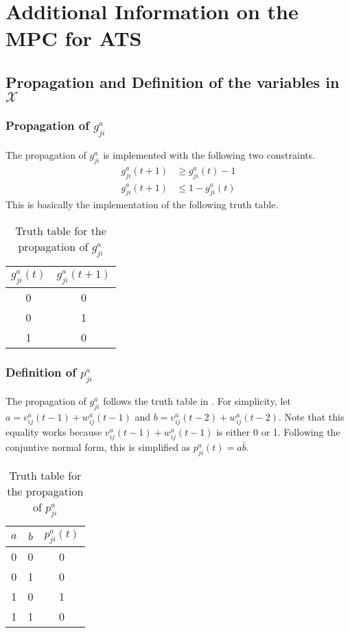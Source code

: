 \chapter{Additional Information on the MPC for ATS}\label{appendix:additional_info_mpc_ats}

\section{Propagation and Definition of the variables in $\mathcal{X}$}

\subsection{Propagation of $g^a_{ji}$}\label{appendix:sec:propagation_g}
The propagation of $g^a_{ji}$ is implemented with the following two constraints. 
\begin{align*}
	g^a_{ji}(t+1) &\ge g^a_{ji}(t) - 1\\
	g^a_{ji}(t+1) &\leq 1- g^a_{ji}(t) 
\end{align*}
This is basically the implementation of the following truth table.
\begin{table}[h]
	\centering
	\begin{tabular}{ |c|c|}
		\hline
		$g^a_{ji}(t)$ &$g^a_{ji}(t+1)$ \\
		\hline
		0&0\\
		0&1\\
		1&0\\
	\end{tabular}
	\label{appendix:tab:propagation_of_arrived}
	\caption{Truth table for the propagation of $g^a_{ji}$}
\end{table}


\subsection{Definition of $p^a_{ji}$}\label{appendix:sec:definition_p}
The propagation of $g^a_{ji}$ follows the truth table in . For simplicity, let $a = v_{ij}^a(t-1) + w_{ij}^a(t-1) $ and $b = v_{ij}^a(t-2) +w_{ij}^a(t-2)$. Note that this equality works because $v_{ij}^a(t-1) + w_{ij}^a(t-1)$ is either 0 or 1. Following the conjuntive normal form, this is simplified as $p^a_{ji}(t) = a\bar{b}$.


\begin{table}
	\centering
	\begin{tabular}{ |c|c|c|}
		\hline
		$a$ &$b$&$p^a_{ji}(t)$ \\
		\hline
		0&0&0\\
		0&1&0\\
		1&0&1\\
		1&1&0\\
	\end{tabular}
	\label{appendix:tab:propagation_of_departed}
	\caption{Truth table for the propagation of $p^a_{ji}$}
\end{table}

